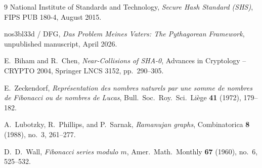 \documentclass[12pt, a4paper]{article}
\theoremstyle{plain}
\theoremstyle{definition}
\begin{document}
\begin{thebibliography}{9}
  National Institute of Standards and Technology,
  \emph{Secure Hash Standard (SHS)},
  FIPS PUB 180-4, August 2015.

  nos3bl33d / DFG,
  \emph{Das Problem Meines Vaters: The Pythagorean Framework},
  unpublished manuscript, April 2026.

  E.~Biham and R.~Chen,
  \emph{Near-Collisions of SHA-0},
  Advances in Cryptology -- CRYPTO 2004, Springer LNCS 3152, pp.~290--305.

  E.~Zeckendorf,
  \emph{Repr\'esentation des nombres naturels par une somme de nombres de Fibonacci ou de nombres de Lucas},
  Bull.\ Soc.\ Roy.\ Sci.\ Li\`ege \textbf{41} (1972), 179--182.

  A.~Lubotzky, R.~Phillips, and P.~Sarnak,
  \emph{Ramanujan graphs},
  Combinatorica \textbf{8} (1988), no.~3, 261--277.

  D.~D.~Wall,
  \emph{Fibonacci series modulo $m$},
  Amer.\ Math.\ Monthly \textbf{67} (1960), no.~6, 525--532.
\end{thebibliography}
\end{document}
